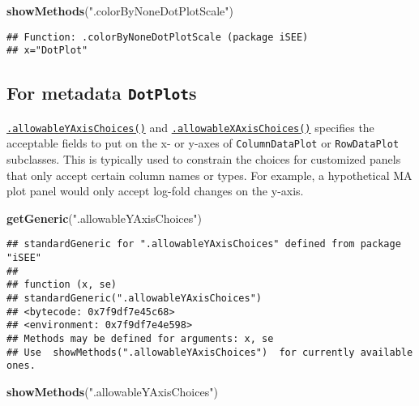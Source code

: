 \documentclass[
]{book}
\newenvironment{Shaded}{\begin{snugshade}}{\end{snugshade}}
\newcommand{\KeywordTok}[1]{\textcolor[rgb]{0.13,0.29,0.53}{\textbf{#1}}}
\newcommand{\NormalTok}[1]{#1}
\newcommand{\StringTok}[1]{\textcolor[rgb]{0.31,0.60,0.02}{#1}}
\begin{document}
\begin{Shaded}
\begin{Highlighting}[]
\KeywordTok{showMethods}\NormalTok{(}\StringTok{".colorByNoneDotPlotScale"}\NormalTok{)}
\end{Highlighting}
\end{Shaded}

\begin{verbatim}
## Function: .colorByNoneDotPlotScale (package iSEE)
## x="DotPlot"
\end{verbatim}

\hypertarget{for-metadata-dotplots}{%
\subsection{\texorpdfstring{For metadata \texttt{DotPlot}s}{For metadata DotPlots}}\label{for-metadata-dotplots}}

\href{https://isee.github.io/iSEE/reference/metadata-plot-generics.html}{\texttt{.allowableYAxisChoices()}} and \href{https://isee.github.io/iSEE/reference/metadata-plot-generics.html}{\texttt{.allowableXAxisChoices()}} specifies the acceptable fields to put on the x- or y-axes of \texttt{ColumnDataPlot} or \texttt{RowDataPlot} subclasses.
This is typically used to constrain the choices for customized panels that only accept certain column names or types.
For example, a hypothetical MA plot panel would only accept log-fold changes on the y-axis.

\begin{Shaded}
\begin{Highlighting}[]
\KeywordTok{getGeneric}\NormalTok{(}\StringTok{".allowableYAxisChoices"}\NormalTok{)}
\end{Highlighting}
\end{Shaded}

\begin{verbatim}
## standardGeneric for ".allowableYAxisChoices" defined from package "iSEE"
## 
## function (x, se) 
## standardGeneric(".allowableYAxisChoices")
## <bytecode: 0x7f9df7e45c68>
## <environment: 0x7f9df7e4e598>
## Methods may be defined for arguments: x, se
## Use  showMethods(".allowableYAxisChoices")  for currently available ones.
\end{verbatim}

\begin{Shaded}
\begin{Highlighting}[]
\KeywordTok{showMethods}\NormalTok{(}\StringTok{".allowableYAxisChoices"}\NormalTok{)}
\end{Highlighting}
\end{Shaded}
\end{document}
